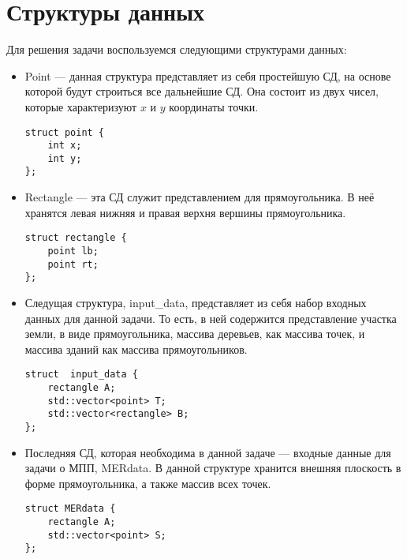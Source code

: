 \documentclass[12pt,a4paper]{article}
\begin{document}
\newpage

\section{Структуры данных} {
Для решения задачи воспользуемся следующими структурами данных:
\begin{itemize}
\item Point — данная структура представляет из себя простейшую СД, на основе которой будут строиться все дальнейшие СД. Она состоит из двух чисел, которые характеризуют $x$ и $y$ координаты точки. \\
\begin{lstlisting}
struct point {
	int x;
	int y;
};

\end{lstlisting}
\item Rectangle — эта СД служит представлением для прямоугольника. В неё хранятся левая нижняя и правая верхня вершины прямоугольника. \\
\begin{lstlisting}
struct rectangle {
	point lb;
	point rt;
};
\end{lstlisting}
\item Следущая структура, input\_data, представляет из себя набор входных данных для данной задачи. То есть, в ней содержится представление участка земли, в виде прямоугольника, массива деревьев, как массива точек, и массива зданий как массива прямоугольников.\\
\begin{lstlisting}
struct  input_data {
	rectangle A;
	std::vector<point> T;
	std::vector<rectangle> B;
};
\end{lstlisting}
\item Последняя СД, которая необходима в данной задаче — входные данные для задачи о МПП, MERdata. В данной структуре хранится внешняя плоскость в форме прямоугольника, а также массив всех точек.
\begin{lstlisting}
struct MERdata {
	rectangle A;
	std::vector<point> S;
};
\end{lstlisting}
\end{itemize}
}
\newpage
\end{document}
